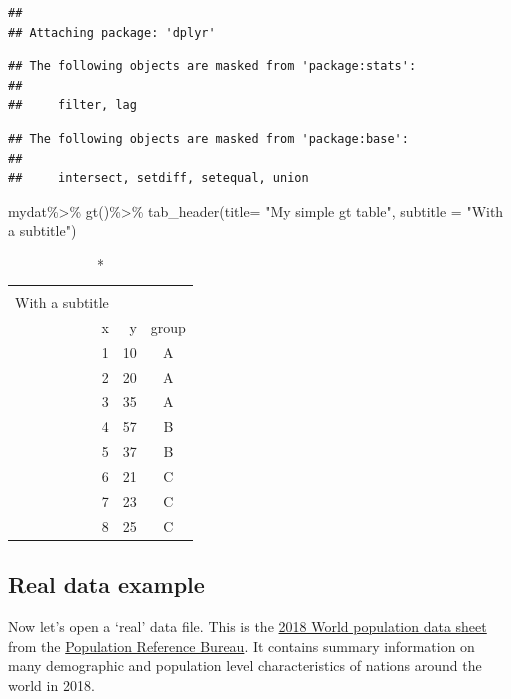 \documentclass[
]{article}
\newenvironment{Shaded}{\begin{snugshade}}{\end{snugshade}}
\newcommand{\AttributeTok}[1]{\textcolor[rgb]{0.77,0.63,0.00}{#1}}
\newcommand{\FunctionTok}[1]{\textcolor[rgb]{0.00,0.00,0.00}{#1}}
\newcommand{\NormalTok}[1]{#1}
\newcommand{\SpecialCharTok}[1]{\textcolor[rgb]{0.00,0.00,0.00}{#1}}
\newcommand{\StringTok}[1]{\textcolor[rgb]{0.31,0.60,0.02}{#1}}
\begin{document}
\begin{verbatim}
## 
## Attaching package: 'dplyr'
\end{verbatim}

\begin{verbatim}
## The following objects are masked from 'package:stats':
## 
##     filter, lag
\end{verbatim}

\begin{verbatim}
## The following objects are masked from 'package:base':
## 
##     intersect, setdiff, setequal, union
\end{verbatim}

\begin{Shaded}
\begin{Highlighting}[]
\NormalTok{mydat}\SpecialCharTok{\%\textgreater{}\%}
  \FunctionTok{gt}\NormalTok{()}\SpecialCharTok{\%\textgreater{}\%}
  \FunctionTok{tab\_header}\NormalTok{(}\AttributeTok{title=} \StringTok{"My simple gt table"}\NormalTok{,}
             \AttributeTok{subtitle =} \StringTok{"With a subtitle"}\NormalTok{)}
\end{Highlighting}
\end{Shaded}

\captionsetup[table]{labelformat=empty,skip=1pt}
\begin{longtable}{rrc}
\caption*{
{\large My simple gt table} \\ 
{\small With a subtitle}
} \\ 
\toprule
x & y & group \\ 
\midrule
1 & 10 & A \\ 
2 & 20 & A \\ 
3 & 35 & A \\ 
4 & 57 & B \\ 
5 & 37 & B \\ 
6 & 21 & C \\ 
7 & 23 & C \\ 
8 & 25 & C \\ 
\bottomrule
\end{longtable}

\hypertarget{real-data-example}{%
\subsection{Real data example}\label{real-data-example}}

Now let's open a `real' data file. This is the \href{https://www.prb.org/2018-world-population-data-sheet-with-focus-on-changing-age-structures/}{2018 World population
data
sheet}
from the \href{http://www.prb.org}{Population Reference Bureau}. It contains
summary information on many demographic and population level
characteristics of nations around the world in 2018.
\end{document}

